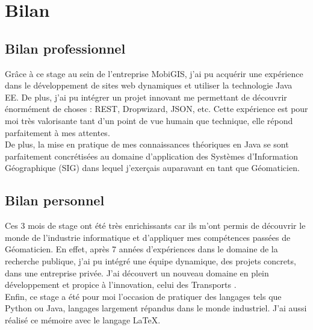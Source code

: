 \chapter{Bilan}
\label{Bilan}


\section{Bilan professionnel}

Grâce à ce stage au sein de l'entreprise MobiGIS, j'ai pu acquérir une expérience dans le développement de sites web dynamiques et utiliser la technologie Java EE. De plus, j'ai pu intégrer un projet innovant me permettant de découvrir énormément de choses : REST, Dropwizard, JSON, etc. Cette expérience est pour moi très valorisante tant d'un point de vue humain que technique, elle répond parfaitement à mes attentes.\\

De plus, la mise en pratique de mes connaissances théoriques en Java se sont parfaitement concrétisées au domaine d'application des Systèmes d'Information Géographique (SIG) dans lequel j'exerçais auparavant en tant que Géomaticien. \\

\section{Bilan personnel}

Ces 3 mois de stage ont été très enrichissants car ils m'ont permis de découvrir le monde de l'industrie informatique et d'appliquer mes compétences passées de Géomaticien. En effet, après 7 années d'expériences dans le domaine de la recherche publique, j'ai pu intégré une équipe dynamique, des projets concrets, dans une entreprise privée. J'ai découvert un nouveau domaine en plein développement et propice à l'innovation, celui des \og Transports \fg. \\

Enfin, ce stage a été pour moi l'occasion de pratiquer des langages tels que Python ou Java, langages largement répandus dans le monde industriel. J'ai aussi réalisé ce mémoire avec le langage  \LaTeX{}.\\